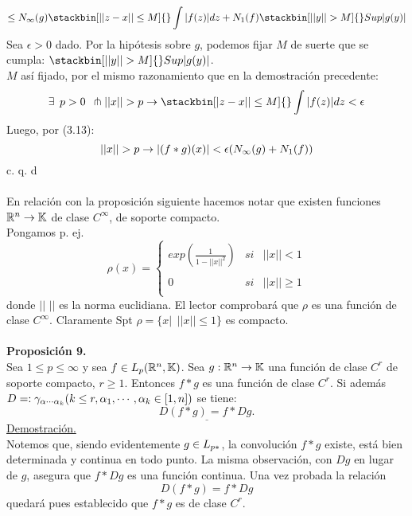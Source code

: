 $$
 \leq N_\infty (g)  \stackbin[||z-x|| \leq M]{}\int{|f(z)|dz}+N_1 (f) \stackbin[||y|| >M]{}Sup |g(y)|
$$
Sea $\epsilon>0$ dado. Por la hipótesis sobre $g$, podemos fijar $M$ de suerte que se cumpla:  $\stackbin[||y|| >M]{}Sup |g(y)|$. \\
$M$ así fijado, por el mismo razonamiento que en la demostración precedente: 
$$
\exists \phantom{s}p>0 \phantom{s}\pitchfork ||x||>p \flecha \stackbin[|z-x||\leq M]{}\int |f(z)|dz <\epsilon
$$
Luego, por (3.13):
$$
||x|| >p \rightarrow |(f*g)(x)| <\epsilon (N_\infty (g)+N_1 (f))
$$
 \phantom{sssssssssssssssssssssssssssssssssss sasdasdasdasdadadssada} c. q. d \\ \\
 En relación con la proposición siguiente hacemos notar que existen funciones $\mathbb{R}^n \rightarrow \mathbb{K}$ de clase $C^\infty$, de soporte compacto.\\
 Pongamos p. ej. \\
 \begin{equation*}
\rho (x)=\left\{ \begin{array}{lcc}
           exp(\frac{1}{1-||x||^2}) & si & ||x||<1 \\
             \\  0 & si &||x|| \geq 1 \\
             \end{array}
   \right.
\end{equation*}
donde $||$ $||$ es la norma euclidiana. El lector comprobará que $\rho$ es una función de clase $C^\infty$. Claramente Spt $\rho=\lbrace x| \phantom{s} ||x|| \leq 1 \rbrace$ es compacto. \\ \\
\textbf{Proposición 9.} \\
Sea $1 \leq p \leq \infty$ y sea $f \in L_p (\mathbb{R}^n, \mathbb{K})$. Sea $g: \mathbb{R}^n \rightarrow \mathbb{K}$ una función de clase $C^r$ de soporte compacto, $r \geq 1$. Entonces $f*g$ es una función de clase $C^r$. Si además $D=: \gamma_{\alpha \cdots \alpha_k} (k \leq r,\alpha_1, \cdots, \alpha_k \in [1,n])$ se tiene: 
$$
\underline{D(f*g)=f*Dg.}
$$
\underline{Demostración.} \\
Notemos que, siendo evidentemente $g \in L_{p*}$, la convolución $f*g$ existe, está bien determinada y continua en todo punto. La misma observación, con $Dg$ en lugar de $g$, asegura que $f*Dg$ es una función continua. Una vez probada la relación
\begin{equation}
D(f*g)=f*Dg
\end{equation}
quedará pues establecido que $f*g$ es de clase $C^r$. \\
